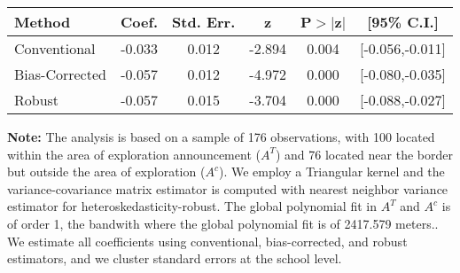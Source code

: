 \begin{table}[htbp]\centering
 \footnotesize 
\begin{tabular}{lccccc}
\hline\hline
Method & Coef. & Std. Err. & z & P$>|$z$|$ & [95\% C.I.] \\ 
\hline \hline  
Conventional & -0.033 & 0.012 & -2.894 & 0.004 & [-0.056,-0.011] \\ 
 Bias-Corrected & -0.057 & 0.012 & -4.972 & 0.000 & [-0.080,-0.035] \\ 
Robust & -0.057 & 0.015 & -3.704 & 0.000 & [-0.088,-0.027] \\ 
  \hline\hline
\end{tabular}
\label{table:rd}
\begin{tablenotes} 
  \justifying \tiny \textbf{Note: }    
   The analysis is based on a sample of 176 observations, with 100 located within the area of exploration announcement ($A^{T}$) and 76 located near the border but outside the area of exploration  ($A^{c}$). 
           We employ a Triangular kernel and the variance-covariance matrix estimator is computed with nearest neighbor variance estimator for heteroskedasticity-robust. The global polynomial fit in  $A^{T}$ and $A^{c}$ is of order 1, the bandwith where the global polynomial fit is of 2417.579 meters.. We estimate all coefficients using conventional, bias-corrected, and robust estimators, and we cluster standard errors at the school level. \end{tablenotes} 
 \end{table} 
